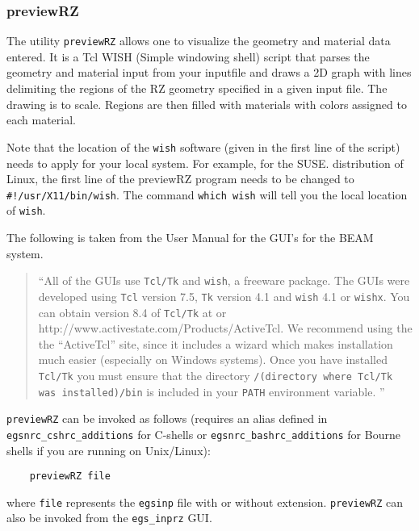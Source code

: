 \documentclass[12pt,twoside]{article}  %
\begin{document}
\subsubsection{previewRZ}

 

The utility \verb+previewRZ+ allows one to visualize the geometry and material
data entered. It is a Tcl WISH (Simple windowing shell)
script that parses the geometry and material input from your inputfile and
draws a 2D graph with lines delimiting the regions of the RZ geometry
specified in a given input file.
The drawing is to scale. Regions are then filled with materials with
colors assigned to each material.

Note that the location of the \verb+wish+ software (given in the first line
of the script) needs to apply
for your local system. For example, for the SUSE. distribution of
Linux, the first line of the previewRZ program needs to be changed to
\verb+#!/usr/X11/bin/wish+. The command {\tt which wish} will tell you
the local location of {\tt wish}.

The following is taken from the User Manual for the GUI's for the BEAM
system\cite{Tr04}.
\begin{quote}
``All of the GUIs use {\tt Tcl/Tk} and {\tt wish}, a freeware package.
The GUIs were developed using {\tt Tcl} version 7.5, {\tt Tk} version
4.1 and {\tt wish} 4.1 or {\tt wishx}.  You
can obtain version 8.4 of {\tt Tcl/Tk} at
 or \\
{http://www.activestate.com/Products/ActiveTcl}.  We recommend using
the the ``ActiveTcl'' site, since it includes a wizard
which makes installation much easier (especially on Windows systems).
Once you have installed {\tt Tcl/Tk} you must ensure that the directory
{\tt /(directory where Tcl/Tk was installed)/bin} is included in your
{\tt PATH} environment variable. ''
\end{quote}
\verb+previewRZ+ can be invoked as follows (requires an alias defined in
\verb+egsnrc_cshrc_additions+ for C-shells or
\verb+egsnrc_bashrc_additions+ for Bourne shells if you are running
on Unix/Linux):
\begin{verbatim}
    previewRZ file
\end{verbatim}
where \verb+file+ represents the \verb+egsinp+ file with or without
extension.  \verb+previewRZ+ can also be invoked from the
{\tt egs\_inprz} GUI\cite{Ma03}.
\end{document}
